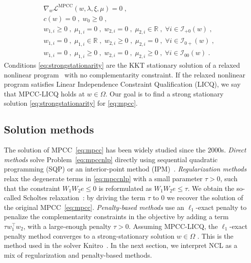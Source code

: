 \documentclass{IEEEtran4PSCC}
\begin{document}
\begin{equation}
  \label{eq:strongstationarity}
  \begin{aligned}
    & \nabla_w \mathcal{L}^{\mathrm{MPCC}}(w, \lambda, \xi, \mu) = 0 \; ,\\
    & c(w) = 0 \; , \; w_0 \geq 0 \; ,\\
    & w_{1,i} \geq 0 \; , \; \mu_{1,i} = 0 \;,\; w_{2, i} = 0 \;,\; \mu_{2,i} \in \mathbb{R} \;,\; \forall i \in \mathcal{I}_{+0}(w) \; , \\
    & w_{1,i} = 0 \; , \; \mu_{1,i} \in \mathbb{R} \;,\; w_{2, i} \geq 0 \;,\; \mu_{2,i} = 0 \;,\; \forall i \in \mathcal{I}_{0+}(w) \; , \\
    & w_{1,i} = 0 \; , \; \mu_{1,i} \geq 0 \;,\; w_{2, i} = 0 \;,\; \mu_{2,i} \geq 0 \;,\; \forall i \in \mathcal{I}_{00}(w) \; .
  \end{aligned}
\end{equation}
Conditions \eqref{eq:strongstationarity} are the KKT stationary solution of a relaxed nonlinear program~\cite{scheel2000mathematical} with no complementarity constraint.
If the relaxed nonlinear program satisfies Linear Independence Constraint Qualification (LICQ),
we say that MPCC-LICQ holds at $w \in \Omega$.
Our goal is to find a strong stationary solution \eqref{eq:strongstationarity} for \eqref{eq:mpcc}.


\subsection{Solution methods}
\label{sec:mpcc:solution}
The solution of MPCC~\eqref{eq:mpcc} has been widely studied since the 2000s.
\emph{Direct methods} solve Problem~\eqref{eq:mpccnlp} directly using
sequential quadratic programming (SQP) or an interior-point method (IPM)~\cite{fletcher2006local}.
\emph{Regularization methods} relax the degenerate terms in \eqref{eq:mpccnlp}
with a small parameter $\tau > 0$, such that the constraint $W_1 W_2 e \leq 0$
is reformulated as $W_1 W_2 e \leq \tau$. We obtain the so-called Scholtes
relaxation~\cite{scholtes2001convergence}: by driving the term $\tau$ to $0$ we recover the solution of the original MPCC~\eqref{eq:mpcc}.
\emph{Penalty-based methods} use an $\ell_1$-exact penalty to penalize the complementarity
constraints in the objective by adding a term $\tau w_1^\top w_2$, with a large-enough penalty $\tau >0$.
Assuming MPCC-LICQ, the $\ell_1$-exact penalty method converges to a strong-stationary solution $w \in \Omega$
\cite{ralph2004some}.
This is the method used in the solver Knitro~\cite{leyffer2006interior}.
In the next section, we interpret NCL as a mix of regularization and penalty-based methods.
\end{document}
